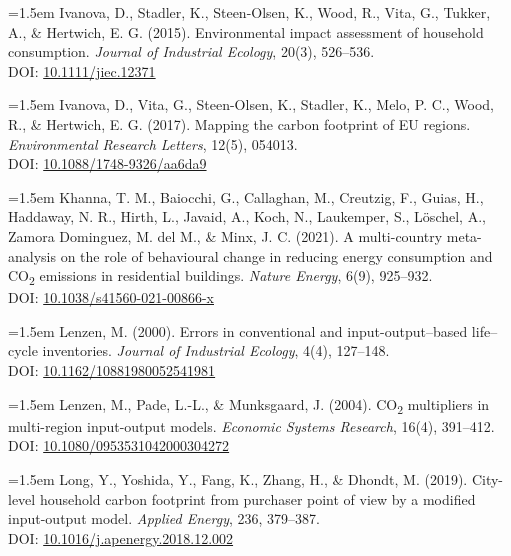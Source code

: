 \documentclass[12pt,a4paper]{article}%
\begin{document}
\vspace{0.5em}
{\small
\noindent
\parbox{\linewidth}{
\hangindent=1.5em
Ivanova, D., Stadler, K., Steen-Olsen, K., Wood, R., Vita, G., Tukker, A., \& Hertwich, E. G. (2015). Environmental impact assessment of household consumption. \textit{Journal of Industrial Ecology}, 20(3), 526–536. \\
DOI: \href{https://doi.org/10.1111/jiec.12371}{10.1111/jiec.12371}
}
}

\vspace{0.5em}
{\small
\noindent
\parbox{\linewidth}{
\hangindent=1.5em
Ivanova, D., Vita, G., Steen-Olsen, K., Stadler, K., Melo, P. C., Wood, R., \& Hertwich, E. G. (2017). Mapping the carbon footprint of EU regions. \textit{Environmental Research Letters}, 12(5), 054013. \\
DOI: \href{https://doi.org/10.1088/1748-9326/aa6da9}{10.1088/1748-9326/aa6da9}
}
}

\vspace{0.5em}
{\small
\noindent
\parbox{\linewidth}{
\hangindent=1.5em
Khanna, T. M., Baiocchi, G., Callaghan, M., Creutzig, F., Guias, H., Haddaway, N. R., Hirth, L., Javaid, A., Koch, N., Laukemper, S., Löschel, A., Zamora Dominguez, M. del M., \& Minx, J. C. (2021). A multi-country meta-analysis on the role of behavioural change in reducing energy consumption and CO\textsubscript{2} emissions in residential buildings. \textit{Nature Energy}, 6(9), 925–932. \\
DOI: \href{https://doi.org/10.1038/s41560-021-00866-x}{10.1038/s41560-021-00866-x}
}
}

\vspace{0.5em}
{\small
\noindent
\parbox{\linewidth}{
\hangindent=1.5em
Lenzen, M. (2000). Errors in conventional and input-output–based life–cycle inventories. \textit{Journal of Industrial Ecology}, 4(4), 127–148. \\
DOI: \href{https://doi.org/10.1162/10881980052541981}{10.1162/10881980052541981}
}
}

\vspace{0.5em}
{\small
\noindent
\parbox{\linewidth}{
\hangindent=1.5em
Lenzen, M., Pade, L.-L., \& Munksgaard, J. (2004). CO\textsubscript{2} multipliers in multi-region input-output models. \textit{Economic Systems Research}, 16(4), 391–412. \\
DOI: \href{https://doi.org/10.1080/0953531042000304272}{10.1080/0953531042000304272}
}
}

\vspace{0.5em}
{\small
\noindent
\parbox{\linewidth}{
\hangindent=1.5em
Long, Y., Yoshida, Y., Fang, K., Zhang, H., \& Dhondt, M. (2019). City-level household carbon footprint from purchaser point of view by a modified input-output model. \textit{Applied Energy}, 236, 379–387. \\
DOI: \href{https://doi.org/10.1016/j.apenergy.2018.12.002}{10.1016/j.apenergy.2018.12.002}
}
}
\end{document}
